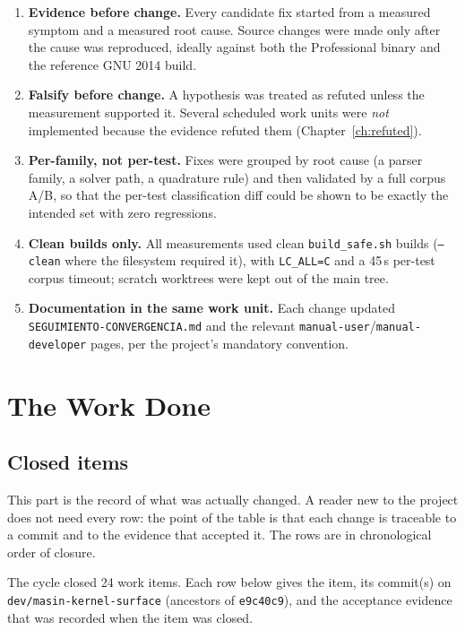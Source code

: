 \documentclass[11pt,a4paper]{report}
\newcommand{\code}[1]{\texttt{#1}}
\begin{document}
\begin{enumerate}
  \item \textbf{Evidence before change.} Every candidate fix started from a
        measured symptom and a measured root cause. Source changes were made only
        after the cause was reproduced, ideally against both the Professional
        binary and the reference GNU 2014 build.
  \item \textbf{Falsify before change.} A hypothesis was treated as refuted
        unless the measurement supported it. Several scheduled work units were
        \emph{not} implemented because the evidence refuted them
        (Chapter~\ref{ch:refuted}).
  \item \textbf{Per-family, not per-test.} Fixes were grouped by root cause (a
        parser family, a solver path, a quadrature rule) and then validated by a
        full corpus A/B, so that the per-test classification diff could be shown
        to be exactly the intended set with zero regressions.
  \item \textbf{Clean builds only.} All measurements used clean
        \code{build\_\allowbreak safe.sh} builds (\code{--clean} where the filesystem
        required it), with \code{LC\_\allowbreak ALL=C} and a 45\,s per-test corpus timeout;
        scratch worktrees were kept out of the main tree.
  \item \textbf{Documentation in the same work unit.} Each change updated
        \code{SEGUIMIENTO-\allowbreak CONVERGENCIA.md} and the relevant
        \code{manual-user}/\code{manual-developer} pages, per the project's
        mandatory convention.
\end{enumerate}

\part{The Work Done}

\chapter{Closed items}
\label{ch:closed}

This part is the record of what was actually changed. A reader new to the
project does not need every row: the point of the table is that each change is
traceable to a commit and to the evidence that accepted it. The rows are in
chronological order of closure.

The cycle closed 24 work items. Each row below gives the item, its commit(s) on
\code{dev/\allowbreak masin-kernel-surface} (ancestors of \code{e9c40c9}), and the acceptance
evidence that was recorded when the item was closed.
\end{document}
